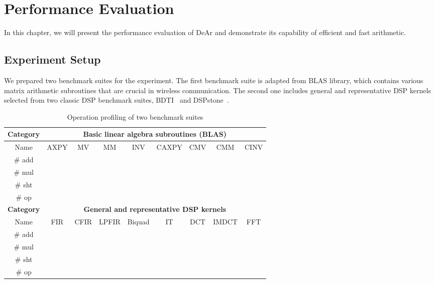 \chapter{Performance Evaluation}
In this chapter, we will present the performance evaluation of DeAr and demonstrate its capability of efficient and fast arithmetic.
\section{Experiment Setup}
\label{sec:evaluation:setup}
We prepared two benchmark suites for the experiment.
The first benchmark suite is adapted from BLAS library, 
which contains various matrix arithmetic subroutines that are crucial in wireless communication.
The second one includes general and representative DSP kernels selected from two classic DSP benchmark suites, BDTI~\cite{btdi} and DSPstone~\cite{dspstone}.
\begin{table}[!ht]
    \centering
    \caption{Operation profiling of two benchmark suites}
    \label{my-label}
    \begin{tabular}{|c|c|c|c|c|c|c|c|c|}
        \hline
        \textbf{Category} & \multicolumn{8}{c|}{\textbf{Basic linear algebra subroutines (BLAS)}} \\ \hline
        Name              & AXPY   & MV     & MM      & INV      & CAXPY  & CMV  & CMM    & CINV  \\ \hline
        \# add            &        &        &         &          &        &      &        &       \\ \hline
        \# mul            &        &        &         &          &        &      &        &       \\ \hline
        \# sht            &        &        &         &          &        &      &        &       \\ \hline
        \# op             &        &        &         &          &        &      &        &       \\ \hline
        \textbf{Category} & \multicolumn{8}{c|}{\textbf{General and representative DSP kernels}}                     \\ \hline
        Name              & FIR    & CFIR   & LPFIR   & Biquad   & IT     & DCT  & IMDCT  & FFT   \\ \hline
        \# add            &        &        &         &          &        &      &        &       \\ \hline
        \# mul            &        &        &         &          &        &      &        &       \\ \hline
        \# sht            &        &        &         &          &        &      &        &       \\ \hline
        \# op             &        &        &         &          &        &      &        &       \\ \hline
    \end{tabular}
\end{table}
